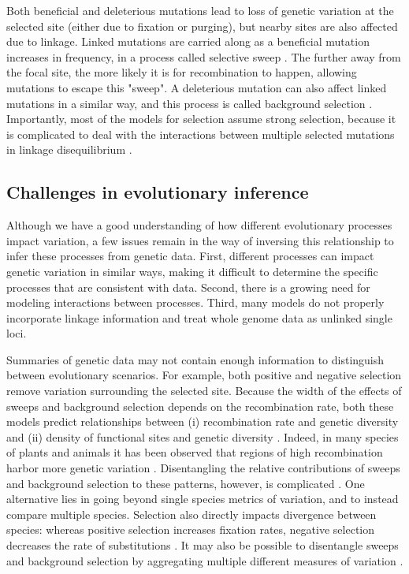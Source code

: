 Both beneficial and deleterious mutations lead to loss of genetic variation at the selected site (either due to fixation or purging),
but nearby sites are also affected due to linkage.
Linked mutations are carried along as a beneficial mutation increases in frequency, in a process called selective sweep \citep{kaplan_hitchhiking_1989, maynard_smith_hitch-hiking_1974, coop_patterns_2012}.
The further away from the focal site, the more likely it is for recombination to happen, allowing mutations to escape this "sweep".
A deleterious mutation can also affect linked mutations in a similar way, and this process is called background selection \citep{charlesworth_effect_1993}.
Importantly, most of the models for selection assume strong selection,
because it is complicated to deal with the interactions between multiple selected mutations in linkage disequilibrium \citep{kim_joint_2000}.

\subsection{Challenges in evolutionary inference}

Although we have a good understanding of how different evolutionary processes impact variation,
a few issues remain in the way of inversing this relationship to infer these processes from genetic data.
First, different processes can impact genetic variation in similar ways, making it difficult to determine the specific processes that are consistent with data.
Second, there is a growing need for modeling interactions between processes.
Third, many models do not properly incorporate linkage information and treat whole genome data as unlinked single loci.

Summaries of genetic data may not contain enough information to distinguish between evolutionary scenarios.
For example, both positive and negative selection remove variation surrounding the selected site.
Because the width of the effects of sweeps and background selection depends on the recombination rate,
both these models predict relationships between (i) recombination rate and genetic diversity and (ii) density of functional sites and genetic diversity \citep{charlesworth_effect_1993, kaplan_hitchhiking_1989, smith_hitch-hiking_1974}.
Indeed, in many species of plants and animals it has been observed that regions of high recombination harbor more genetic variation \citep{corbett-detig_natural_2015}.
Disentangling the relative contributions of sweeps and background selection to these patterns, however, is complicated \citep{leffler_revisiting_2012, andolfatto_adaptive_2001}.
One alternative lies in going beyond single species metrics of variation, and to instead compare multiple species.
Selection also directly impacts divergence between species: whereas positive selection increases fixation rates, 
negative selection decreases the rate of substitutions \citep{andolfatto_hitchhiking_2007,macpherson_genomewide_2007,cai_pervasive_2009} .
It may also be possible to disentangle sweeps and background selection by aggregating multiple different measures of variation \citep{schrider_background_2020}.

